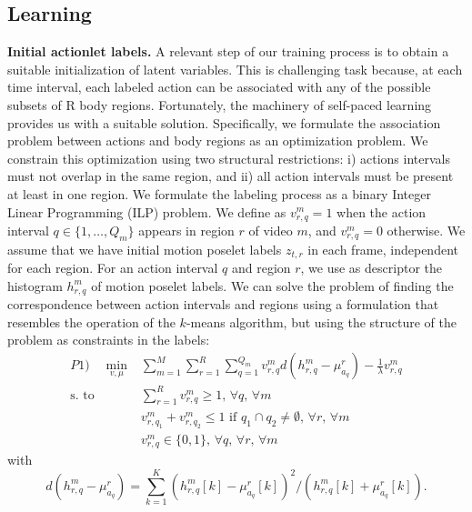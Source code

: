 \subsection{Learning} \label{subsec:learning}

\textbf{Initial actionlet labels.} A relevant step of our training process is to obtain a suitable initialization 
of latent variables. This is challenging task because, at each time 
interval, each labeled action can be associated with any of the possible 
subsets of R body regions. Fortunately, the machinery of self-paced 
learning \cite{Kumar:EtAl:2010} provides us with a suitable solution. Specifically, we 
formulate the association problem between actions and body regions as an 
optimization problem. We constrain this optimization using two structural 
restrictions: i) actions intervals must not overlap in the same region, and 
ii) all action 
intervals must be present at least in one region. We formulate the labeling 
process as a binary Integer Linear Programming (ILP) problem. We define as 
$v_{r,q}^m=1$ when the action interval $q \in \{1,\dots,Q_m\}$ appears in 
region 
$r$ of video $m$, and $v_{r,q}^m=0$ otherwise. We assume that we have initial 
motion poselet 
labels 
$z_{t,r}$ in each frame, independent for each region. For an action interval $q$ and region $r$, we use as 
descriptor the histogram $h_{r,q}^m$ of motion poselet labels. We can solve the problem of finding 
the correspondence between action intervals and regions using a formulation 
that resembles the operation of the $k$-means algorithm, but using the 
structure of the problem as constraints in the labels:
{\small
\begin{equation}
\begin{split}
P1) \quad \min_{v,\mu} &\sum_{m=1}^M  \sum_{r=1}^R \sum_{q=1}^{Q_m}  v_{r,q}^m 
d( h_{r,q}^m - \mu_{a_q}^r) -\frac{1}{\lambda} v_{r,q}^m\\ 
 \text{s. to} 
\quad 
& \sum_{r=1}^R v_{r,q}^m \ge 1\text{, }\forall q\text{, }\forall m \\ 
& v_{r,q_1}^m + v_{r,q_2}^m \le 1 \text{ if } q_1\cap q_2 \neq \emptyset 
\text{, 
}\forall r\text{, }\forall m\\  
& v_{r,q}^m \in \{0,1\}\text{, }\forall q\text{, }\forall{r}\text{, }\forall m
\end{split}
\end{equation}
with
\begin{equation}
d( h_{r,q}^m - \mu_{a_q}^r) = \sum_{k=1}^K (h_{r,q}^m[k] - 
\mu_{a_q}^r[k])^2/(h_{r,q}^m[k] +\mu_{a_q}^r[k]).
\end{equation}}

